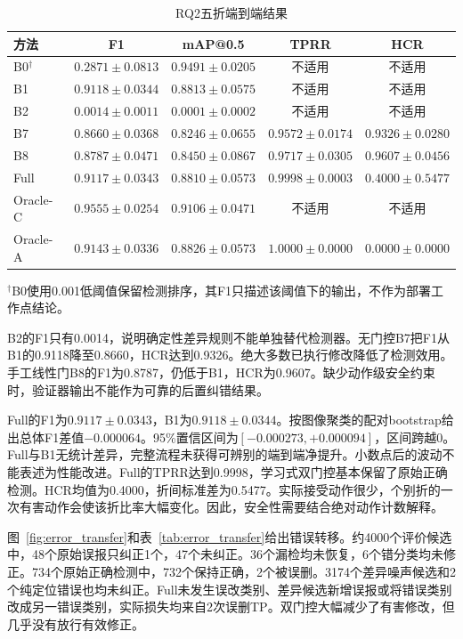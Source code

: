 \begin{table}[t]
  \centering
  \caption{RQ2五折端到端结果}
  \label{tab:rq2_main}
  \setlength{\tabcolsep}{5pt}
  \begin{tabular}{lcccc}
    \hline
    方法 & F1 & mAP@0.5 & TPRR & HCR \\
    \hline
    B0$^{\dagger}$ & $0.2871\pm0.0813$ & $0.9491\pm0.0205$ & 不适用 & 不适用 \\
    B1 & $0.9118\pm0.0344$ & $0.8813\pm0.0575$ & 不适用 & 不适用 \\
    B2 & $0.0014\pm0.0011$ & $0.0001\pm0.0002$ & 不适用 & 不适用 \\
    B7 & $0.8660\pm0.0368$ & $0.8246\pm0.0655$ & $0.9572\pm0.0174$ & $0.9326\pm0.0280$ \\
    B8 & $0.8787\pm0.0471$ & $0.8450\pm0.0867$ & $0.9717\pm0.0305$ & $0.9607\pm0.0456$ \\
    Full & $0.9117\pm0.0343$ & $0.8810\pm0.0573$ & $0.9998\pm0.0003$ & $0.4000\pm0.5477$ \\
    Oracle-C & $0.9555\pm0.0254$ & $0.9106\pm0.0471$ & 不适用 & 不适用 \\
    Oracle-A & $0.9143\pm0.0336$ & $0.8826\pm0.0573$ & $1.0000\pm0.0000$ & $0.0000\pm0.0000$ \\
    \hline
  \end{tabular}
  \vspace{2pt}
  \parbox{0.95\textwidth}{\footnotesize $^{\dagger}$B0使用0.001低阈值保留检测排序，其F1只描述该阈值下的输出，不作为部署工作点结论。}
\end{table}

B2的F1只有0.0014，说明确定性差异规则不能单独替代检测器。无门控B7把F1从B1的0.9118降至0.8660，HCR达到0.9326。绝大多数已执行修改降低了检测效用。手工线性门B8的F1为0.8787，仍低于B1，HCR为0.9607。缺少动作级安全约束时，验证器输出不能作为可靠的后置纠错结果。

Full的F1为$0.9117\pm0.0343$，B1为$0.9118\pm0.0344$。按图像聚类的配对bootstrap给出总体F1差值$-0.000064$。95\%置信区间为$[-0.000273,+0.000094]$，区间跨越0。Full与B1无统计差异，完整流程未获得可辨别的端到端净提升。小数点后的波动不能表述为性能改进。Full的TPRR达到0.9998，学习式双门控基本保留了原始正确检测。HCR均值为0.4000，折间标准差为0.5477。实际接受动作很少，个别折的一次有害动作会使该折比率大幅变化。因此，安全性需要结合绝对动作计数解释。

图~\ref{fig:error_transfer}和表~\ref{tab:error_transfer}给出错误转移。约4000个评价候选中，48个原始误报只纠正1个，47个未纠正。36个漏检均未恢复，6个错分类均未修正。734个原始正确检测中，732个保持正确，2个被误删。3174个差异噪声候选和2个纯定位错误也均未纠正。Full未发生误改类别、差异候选新增误报或将错误类别改成另一错误类别，实际损失均来自2次误删TP。双门控大幅减少了有害修改，但几乎没有放行有效修正。

